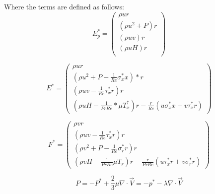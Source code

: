 \documentclass{article}
\begin{document}
Where the terms are defined as follows:
\[
{E^*_p} = {\begin{pmatrix}
{\rho}{u}{r} \\
({\rho}{u^2} + {P}){r} \\
({\rho}{u}{v}){r} \\
({\rho}{u}{H}){r} \\
\end{pmatrix}}
\]
\par{}
\[
{E^*} = {\begin{pmatrix}
{\rho}{u}{r} \\
({\rho}{u^2} + P - \frac{1}{Re}{\sigma^*_xx})*{r} \\
({\rho}{u}{v} - \frac{1}{Re}{\tau^*_xr}){r} \\
({\rho}{u}{H} - \frac{1}{{Pr}{Re}}*{\mu}{T^*_x}){r} -
    \frac{r}{Re}({u}{\sigma^*_xx}+{v}{\tau^*_xr})
\end{pmatrix}}
\]
\par{}
\[
{F^*} = {\begin{pmatrix}
{\rho}{v}{r} \\
({\rho}{u}{v} - \frac{1}{Re}{\tau^*_xr}){r} \\
({\rho}{v^2} + {P} - \frac{1}{Re}{\sigma^*_rr}){r} \\
({\rho}{v}{H} - \frac{1}{{Pr}{Re}}{\mu}{T_r}){r} -
    \frac{r}{{Pr}{Re}}({u}{\tau^*_xr}+{v}{\sigma^*_rr})
\end{pmatrix}} 
\]
\par{}
\[
{P} = - P^* + \frac{2}{3}\mu \nabla \cdot \overrightarrow{V} = -p^* - \lambda\nabla\cdot\overrightarrow{V}
\]
\end{document}
